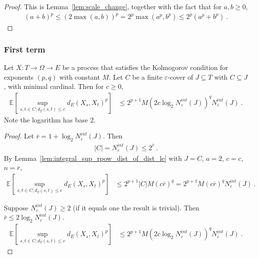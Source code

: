 \begin{proof}\leanok
This is Lemma~\ref{lem:scale_change}, together with the fact that for $a, b \ge 0$,
\begin{align*}
  (a + b)^p \le (2\max(a,b))^p = 2^p \max(a^p,b^p) \le 2^p (a^p + b^p)
  \: .
\end{align*}
\end{proof}



\subsubsection{First term}


\begin{lemma}\label{lem:integral_sup_rpow_dist_cover_of_dist_le}
  \leanok
Let $X : T \to \Omega \to E$ be a process that satisfies the Kolmogorov condition for exponents $(p,q)$ with constant $M$.
Let $C$ be a finite $\varepsilon$-cover of $J \subseteq T$ with $C \subseteq J$, with minimal cardinal.
Then for $c \ge 0$,
\begin{align*}
  \mathbb{E} \left[ \sup_{s, t \in C; d_T(s, t) \le c} d_E(X_s, X_t)^p \right]
  &\le 2^{p+1} M \left(2 c \log_2 N^{int}_{\varepsilon}(J) \right)^q  N^{int}_{\varepsilon}(J)
  \: .
\end{align*}
Note the logarithm has base $2$.
\end{lemma}

\begin{proof}\leanok
Let $\bar{r} = 1 + \log_2 N^{int}_{\varepsilon}(J)$. Then
\begin{align*}
  \vert C \vert
  = N^{int}_{\varepsilon}(J)
  \le 2^{\bar{r}}
  \: .
\end{align*}
By Lemma~\ref{lem:integral_sup_rpow_dist_of_dist_le} with $J = C$, $a = 2$, $c = c$, $n = \bar{r}$,
\begin{align*}
  \mathbb{E} \left[ \sup_{s, t \in C; d_T(s, t) \le c} d_E(X_s, X_t)^p \right]
  &\le 2^{p+1} |C| M (c \bar{r})^q
  = 2^{p+1} M (c \bar{r})^q N^{int}_{\varepsilon}(J)
  \: .
\end{align*}

Suppose $N^{int}_{\varepsilon}(J) \ge 2$ (if it equals one the result is trivial).
Then $\bar{r} \le 2 \log_2 N^{int}_{\varepsilon}(J)$.
\begin{align*}
  \mathbb{E} \left[ \sup_{s, t \in C; d_T(s, t) \le c} d_E(X_s, X_t)^p \right]
  &\le 2^{p+1} M \left(2 c \log_2 N^{int}_{\varepsilon}(J) \right)^q  N^{int}_{\varepsilon}(J)
  \: .
\end{align*}
\end{proof}


